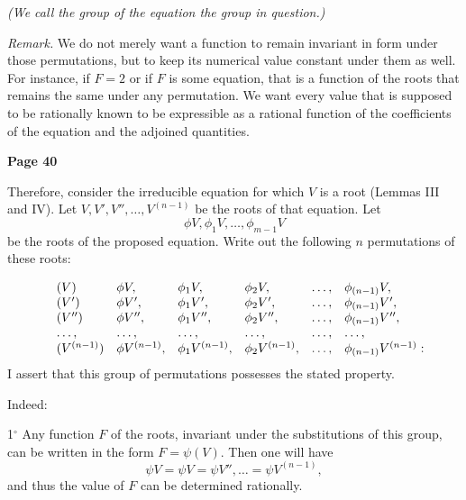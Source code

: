 \documentclass{article}
\begin{document}
\medskip

\noindent
\emph{(We call the group of the equation the group in question.)}

\smallskip

\noindent
\emph{Remark.} We do not merely want a function to remain invariant in form under those permutations, but to keep its numerical value constant under them as well. For instance, if \(F = 2\) or if \(F\) is some equation, that is a function of the roots that remains the same under any permutation. We want every value that is supposed to be rationally known to be expressible as a rational function of the coefficients of the equation and the adjoined quantities.

\bigskip


\newpage

\centerline{\textbf{Page 40}}

\medskip

\noindent
Therefore, consider the irreducible equation for which \(V\) is a root (Lemmas III and IV). Let \(V, V', V'', \dots, V^{(n-1)}\) be the roots of that equation. Let 
\[\phi V, \phi_1 V, \dots, \phi_{m-1} V\]
be the roots of the proposed equation. Write out the following \(n\) permutations of these roots:

\[
\begin{array}{l l l l l l l}
&(V) & \phi V, & \phi_1 V, & \phi_2 V, & \dots, & \phi_{(n-1)} V, \\
&(V') & \phi V', & \phi_1 V', & \phi_2 V', & \dots, & \phi_{(n-1)} V', \\
&(V'') & \phi V'', & \phi_1 V'', & \phi_2 V'', & \dots, & \phi_{(n-1)} V'', \\
&\dots,&\dots,&\dots,&\dots,&\dots,&\dots, \\
&(V^{(n-1)}) & \phi V^{(n-1)}, & \phi_1 V^{(n-1)}, & \phi_2 V^{(n-1)}, & \dots, & \phi_{(n-1)}V^{(n-1)}:
\end{array}
\]
\noindent
I assert that this group of permutations possesses the stated property. 

\smallskip

Indeed:

\smallskip


1\(^\circ\) Any function \(F\) of the roots, invariant under the substitutions of this group, can be written in the form
$
F = \psi(V).
$
Then one will have
\[
\psi V = \psi V = \psi V'', \dots = \psi V^{(n-1)},
\]
and thus the value of \(F\) can be determined rationally.

\smallskip
\end{document}
